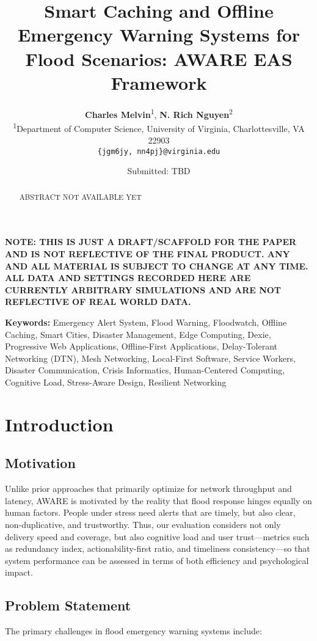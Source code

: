 \documentclass[11pt,twocolumn]{article}
\title{\Large\textbf{Smart Caching and Offline Emergency Warning Systems for Flood Scenarios: AWARE EAS Framework}}
\author{
    \textbf{Charles Melvin}\textsuperscript{1}, \textbf{N. Rich Nguyen}\textsuperscript{2} \\
    \small\textsuperscript{1}Department of Computer Science, University of Virginia, Charlottesville, VA 22903 \\
    \small\texttt{\{jgm6jy, nn4pj\}@virginia.edu}
}
\date{\small Submitted: TBD}
\begin{document}
\maketitle

\textbf{NOTE: THIS IS JUST A DRAFT/SCAFFOLD FOR THE PAPER AND IS NOT REFLECTIVE OF THE FINAL PRODUCT. ANY AND ALL MATERIAL IS SUBJECT TO CHANGE AT ANY TIME. ALL DATA AND SETTINGS RECORDED HERE ARE CURRENTLY ARBITRARY SIMULATIONS AND ARE NOT REFLECTIVE OF REAL WORLD DATA.}

\begin{abstract}
\noindent ABSTRACT NOT AVAILABLE YET
\end{abstract}

\noindent\textbf{Keywords:} 
Emergency Alert System, Flood Warning, Floodwatch, Offline Caching, 
Smart Cities, Disaster Management, Edge Computing, Dexie, 
Progressive Web Applications, Offline-First Applications, 
Delay-Tolerant Networking (DTN), Mesh Networking, 
Local-First Software, Service Workers, 
Disaster Communication, Crisis Informatics, 
Human-Centered Computing, Cognitive Load, 
Stress-Aware Design, Resilient Networking

\vspace{0.3cm}

\section{Introduction}

\subsection{Motivation}

Unlike prior approaches that primarily optimize for network throughput and latency, AWARE is motivated by the reality that flood response hinges equally on human factors. People under stress need alerts that are timely, but also clear, non-duplicative, and trustworthy. Thus, our evaluation considers not only delivery speed and coverage, but also cognitive load and user trust—metrics such as redundancy index, actionability-first ratio, and timeliness consistency—so that system performance can be assessed in terms of both efficiency and psychological impact.


\subsection{Problem Statement}
The primary challenges in flood emergency warning systems include:
\end{document}
